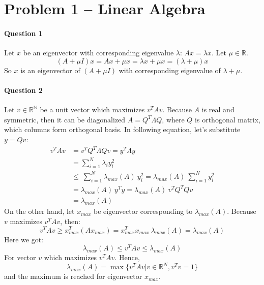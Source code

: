 \section{Problem 1 – Linear Algebra}

\paragraph{Question 1}
Let $x$ be an eigenvector with corresponding eigenvalue $\lambda$: $Ax = \lambda x$.
Let $\mu \in \mathbb{R}$. 
\begin{equation*}
    (A + \mu I)x = Ax + \mu x = \lambda x + \mu x = (\lambda + \mu)x
\end{equation*}
So $x$ is an eigenvector of $(A + \mu I)$ with corresponding eigenvalue of $\lambda + \mu$.


\paragraph{Question 2}
Let $v \in \mathbb{R^N}$ be a unit vector which maximizes $v^T A v$.
Because $A$ is real and symmetric, then it can be diagonalized $A = Q^T \Lambda Q$, where $Q$ is orthogonal matrix, which columns form orthogonal basis.
In following equation, let's substitute $y = Qv$:
\begin{align*}
    v^T A v &= v^T Q^T \Lambda Q v = y^T \Lambda y \\
            &= \sum_{i=1}^{N}\lambda_i y_i^2\\
            &\leq \: \sum_{i=1}^{N} \lambda_{max}(A) \: y_i^2
              = \lambda_{max}(A) \: \sum_{i=1}^{N} y_i^2\\
            &= \lambda_{max}(A) \: y^T y = \lambda_{max}(A) \: v^T Q^T Q v\\
            &= \lambda_{max}(A)
\end{align*}
On the other hand, let $x_{max}$ be eigenvector corresponding to $\lambda_{max}(A)$.
Because $v$ maximizes $v^T A v$, then:
\begin{equation*}
    v^T A v \geq x_{max}^T (A x_{max} ) = x_{max}^T  x_{max} \: \lambda_{max}(A)  = \lambda_{max}(A)
\end{equation*}
Here we got:
\begin{equation*}
    \lambda_{max}(A) \leq v^T A v \leq \lambda_{max}(A)
\end{equation*}
For vector $v$ which maximizes $v^T A v$.
Hence,
\begin{equation*}
    \lambda_{max}(A) = \max \{v^T A v | v\in\mathbb{R}^N, v^T v = 1\}
\end{equation*}
and the maximum is reached for eigenvector $x_{max}$.

